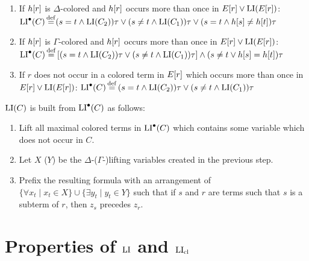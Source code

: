\documentclass[,%
	draft=false,%
	numbers=noendperiod
	11pt,
	a4paper,
	oneside,%
	openany,
]{memoir}
\begin{document}
\begin{defi}
\begin{itemize}
			\begin{enumerate}

				\item If $h[r]$ is $\Delta$-colored and $h[r]$ occurs more than once in $E[r] \lor \operatorname{LI}(E[r])$:
					\newline
					$\operatorname{LI}^\bullet(C) \operatorname{\stackrel{\mathrm{def}}{=}}  ( s=t \land \operatorname{LI}(C_2) )\tau \lor (s\neq t \land \operatorname{LI}(C_1))\tau \lor (s=t \land h[s] \neq      h[t])\tau$

				\item If $h[r]$ is $\Gamma$-colored and $h[r]$ occurs more than once in $E[r] \lor \operatorname{LI}(E[r])$:
					\newline
					$\operatorname{LI}^\bullet(C)\operatorname{\stackrel{\mathrm{def}}{=}}{} [ ( s=t \land \operatorname{LI}(C_2) )\tau \lor (s\neq t \land \operatorname{LI}(C_1))\tau ] \land\allowbreak (s\neq t \lor h[s] = h[t])\tau$

				\item If $r$ does not occur in a colored term in $E[r]$ which occurs more than once in $E[r] \lor \operatorname{LI}(E[r])$:
					\newline
					$\operatorname{LI}^\bullet(C) \operatorname{\stackrel{\mathrm{def}}{=}}{} ( s=t \land \operatorname{LI}(C_2) )\tau \lor (s\neq t \land \operatorname{LI}(C_1))\tau $ 

			\end{enumerate}

	\end{itemize}

	$\operatorname{LI}(C)$ is built from $\operatorname{LI}^\bullet(C)$ as follows:

	\begin{enumerate}
		\item Lift all maximal colored terms in $\operatorname{LI}^\bullet(C)$ which contains some variable which does not occur in $C$.
		\item Let $X$ ($Y$) be the $\Delta$-($\Gamma$-)lifting variables created in the previous step.
		\item Prefix the resulting formula with an arrangement of $\{\forall x_t \mid x_t \in X\}\cup\allowbreak\{\exists y_t \mid y_t \in Y\}$ such that if $s$ and $r$ are terms such that $s$ is a subterm of $r$, then $z_s$ precedes $z_r$.
			\qedhere
	\end{enumerate}
\end{defi}

\section{Properties of $\operatorname{LI}$ and $\operatorname{LI}_{\operatorname{cl}}$}
\end{document}
